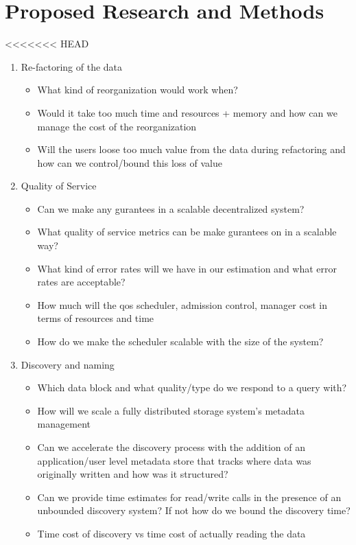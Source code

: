 \section{Proposed Research and Methods}
\label{subsec:challenges}
<<<<<<< HEAD
\label{sec:proposed}

\begin{enumerate}
\item Re-factoring of the data
  \begin{itemize}
  \item What kind of reorganization would work when?
  \item Would it take too much time and resources + memory and how can we
    manage the cost of the reorganization
  \item Will the users loose too much value from the data during refactoring
    and how can we control/bound this loss of value
  \end{itemize}
\item Quality of Service
  \begin{itemize}
  \item Can we make any gurantees in a scalable decentralized system?
  \item What quality of service metrics can be make gurantees on in a scalable
    way?
  \item What kind of error rates will we have in our estimation and what error
    rates are acceptable?
  \item How much will the qos scheduler, admission control, manager cost in
    terms of resources and time
  \item How do we make the scheduler scalable with the size of the system?
  \end{itemize}
\item Discovery and naming
  \begin{itemize}
  \item Which data block and what quality/type do we respond to a query
    with?
  \item How will we scale a fully distributed storage system's metadata
    management
  \item Can we accelerate the discovery process with the addition of an
    application/user level metadata store that tracks where data was
    originally written and how was it structured?
  \item Can we provide time estimates for read/write calls in the presence of
    an unbounded discovery system? If not how do we bound the discovery time?
  \item Time cost of discovery vs time cost of actually reading the data

\end{itemize}
\end{enumerate}
